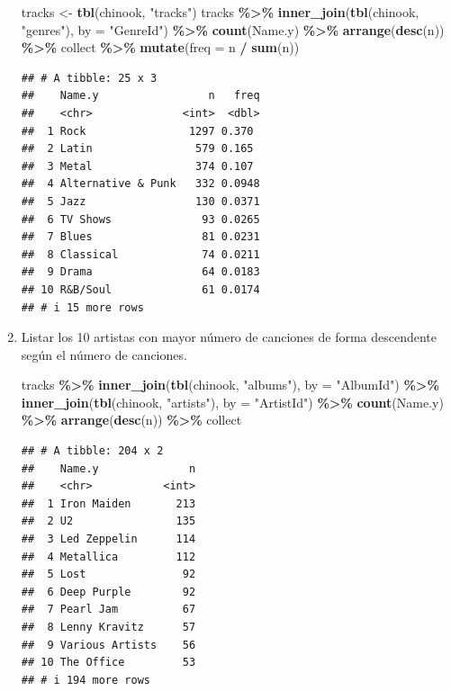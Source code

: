 \documentclass[
]{book}
\newenvironment{Shaded}{\begin{snugshade}}{\end{snugshade}}
\newcommand{\AttributeTok}[1]{\textcolor[rgb]{0.13,0.29,0.53}{#1}}
\newcommand{\FunctionTok}[1]{\textcolor[rgb]{0.13,0.29,0.53}{\textbf{#1}}}
\newcommand{\NormalTok}[1]{#1}
\newcommand{\OtherTok}[1]{\textcolor[rgb]{0.56,0.35,0.01}{#1}}
\newcommand{\SpecialCharTok}[1]{\textcolor[rgb]{0.81,0.36,0.00}{\textbf{#1}}}
\newcommand{\StringTok}[1]{\textcolor[rgb]{0.31,0.60,0.02}{#1}}
\begin{document}
\begin{enumerate}
\begin{Shaded}
\begin{Highlighting}[]
\NormalTok{tracks }\OtherTok{\textless{}{-}} \FunctionTok{tbl}\NormalTok{(chinook, }\StringTok{"tracks"}\NormalTok{)}
\NormalTok{tracks }\SpecialCharTok{\%\textgreater{}\%} \FunctionTok{inner\_join}\NormalTok{(}\FunctionTok{tbl}\NormalTok{(chinook, }\StringTok{"genres"}\NormalTok{), }\AttributeTok{by =} \StringTok{"GenreId"}\NormalTok{) }\SpecialCharTok{\%\textgreater{}\%} \FunctionTok{count}\NormalTok{(Name.y) }\SpecialCharTok{\%\textgreater{}\%} 
    \FunctionTok{arrange}\NormalTok{(}\FunctionTok{desc}\NormalTok{(n)) }\SpecialCharTok{\%\textgreater{}\%}\NormalTok{ collect }\SpecialCharTok{\%\textgreater{}\%} \FunctionTok{mutate}\NormalTok{(}\AttributeTok{freq =}\NormalTok{ n }\SpecialCharTok{/} \FunctionTok{sum}\NormalTok{(n))}
\end{Highlighting}
\end{Shaded}

\begin{verbatim}
## # A tibble: 25 x 3
##    Name.y                 n   freq
##    <chr>              <int>  <dbl>
##  1 Rock                1297 0.370 
##  2 Latin                579 0.165 
##  3 Metal                374 0.107 
##  4 Alternative & Punk   332 0.0948
##  5 Jazz                 130 0.0371
##  6 TV Shows              93 0.0265
##  7 Blues                 81 0.0231
##  8 Classical             74 0.0211
##  9 Drama                 64 0.0183
## 10 R&B/Soul              61 0.0174
## # i 15 more rows
\end{verbatim}
\item
  Listar los 10 artistas con mayor número de canciones
  de forma descendente según el número de canciones.

\begin{Shaded}
\begin{Highlighting}[]
\NormalTok{tracks }\SpecialCharTok{\%\textgreater{}\%} \FunctionTok{inner\_join}\NormalTok{(}\FunctionTok{tbl}\NormalTok{(chinook, }\StringTok{"albums"}\NormalTok{), }\AttributeTok{by =} \StringTok{"AlbumId"}\NormalTok{) }\SpecialCharTok{\%\textgreater{}\%} 
    \FunctionTok{inner\_join}\NormalTok{(}\FunctionTok{tbl}\NormalTok{(chinook, }\StringTok{"artists"}\NormalTok{), }\AttributeTok{by =} \StringTok{"ArtistId"}\NormalTok{) }\SpecialCharTok{\%\textgreater{}\%} 
    \FunctionTok{count}\NormalTok{(Name.y) }\SpecialCharTok{\%\textgreater{}\%} \FunctionTok{arrange}\NormalTok{(}\FunctionTok{desc}\NormalTok{(n)) }\SpecialCharTok{\%\textgreater{}\%}\NormalTok{ collect}
\end{Highlighting}
\end{Shaded}

\begin{verbatim}
## # A tibble: 204 x 2
##    Name.y              n
##    <chr>           <int>
##  1 Iron Maiden       213
##  2 U2                135
##  3 Led Zeppelin      114
##  4 Metallica         112
##  5 Lost               92
##  6 Deep Purple        92
##  7 Pearl Jam          67
##  8 Lenny Kravitz      57
##  9 Various Artists    56
## 10 The Office         53
## # i 194 more rows
\end{verbatim}
\end{enumerate}
\end{document}
